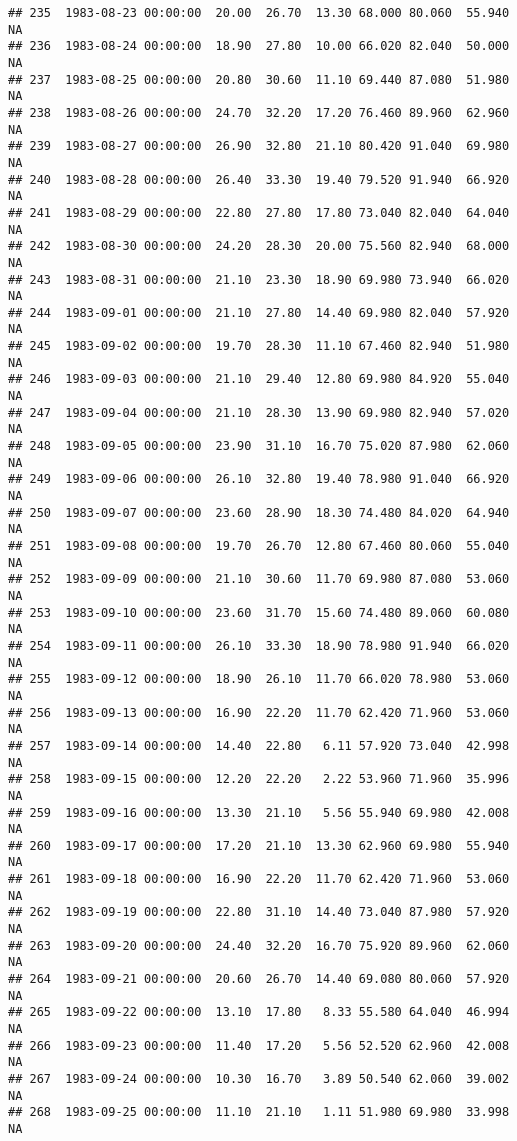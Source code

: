 \documentclass{article}\usepackage{graphicx, color}
\makeatletter
\newenvironment{kframe}{%
 \def\at@end@of@kframe{}%
 \ifinner\ifhmode%
  \def\at@end@of@kframe{\end{minipage}}%
  \begin{minipage}{\columnwidth}%
 \fi\fi%
 \def\FrameCommand##1{\hskip\@totalleftmargin \hskip-\fboxsep
 \colorbox{shadecolor}{##1}\hskip-\fboxsep
     \hskip-\linewidth \hskip-\@totalleftmargin \hskip\columnwidth}%
 \MakeFramed {\advance\hsize-\width
   \@totalleftmargin\z@ \linewidth\hsize
   \@setminipage}}%
 {\par\unskip\endMakeFramed%
 \at@end@of@kframe}
\newenvironment{knitrout}{}{} %
\makeatother
\begin{document}
\begin{knitrout}
\begin{kframe}
\begin{verbatim}
## 235  1983-08-23 00:00:00  20.00  26.70  13.30 68.000 80.060  55.940     NA
## 236  1983-08-24 00:00:00  18.90  27.80  10.00 66.020 82.040  50.000     NA
## 237  1983-08-25 00:00:00  20.80  30.60  11.10 69.440 87.080  51.980     NA
## 238  1983-08-26 00:00:00  24.70  32.20  17.20 76.460 89.960  62.960     NA
## 239  1983-08-27 00:00:00  26.90  32.80  21.10 80.420 91.040  69.980     NA
## 240  1983-08-28 00:00:00  26.40  33.30  19.40 79.520 91.940  66.920     NA
## 241  1983-08-29 00:00:00  22.80  27.80  17.80 73.040 82.040  64.040     NA
## 242  1983-08-30 00:00:00  24.20  28.30  20.00 75.560 82.940  68.000     NA
## 243  1983-08-31 00:00:00  21.10  23.30  18.90 69.980 73.940  66.020     NA
## 244  1983-09-01 00:00:00  21.10  27.80  14.40 69.980 82.040  57.920     NA
## 245  1983-09-02 00:00:00  19.70  28.30  11.10 67.460 82.940  51.980     NA
## 246  1983-09-03 00:00:00  21.10  29.40  12.80 69.980 84.920  55.040     NA
## 247  1983-09-04 00:00:00  21.10  28.30  13.90 69.980 82.940  57.020     NA
## 248  1983-09-05 00:00:00  23.90  31.10  16.70 75.020 87.980  62.060     NA
## 249  1983-09-06 00:00:00  26.10  32.80  19.40 78.980 91.040  66.920     NA
## 250  1983-09-07 00:00:00  23.60  28.90  18.30 74.480 84.020  64.940     NA
## 251  1983-09-08 00:00:00  19.70  26.70  12.80 67.460 80.060  55.040     NA
## 252  1983-09-09 00:00:00  21.10  30.60  11.70 69.980 87.080  53.060     NA
## 253  1983-09-10 00:00:00  23.60  31.70  15.60 74.480 89.060  60.080     NA
## 254  1983-09-11 00:00:00  26.10  33.30  18.90 78.980 91.940  66.020     NA
## 255  1983-09-12 00:00:00  18.90  26.10  11.70 66.020 78.980  53.060     NA
## 256  1983-09-13 00:00:00  16.90  22.20  11.70 62.420 71.960  53.060     NA
## 257  1983-09-14 00:00:00  14.40  22.80   6.11 57.920 73.040  42.998     NA
## 258  1983-09-15 00:00:00  12.20  22.20   2.22 53.960 71.960  35.996     NA
## 259  1983-09-16 00:00:00  13.30  21.10   5.56 55.940 69.980  42.008     NA
## 260  1983-09-17 00:00:00  17.20  21.10  13.30 62.960 69.980  55.940     NA
## 261  1983-09-18 00:00:00  16.90  22.20  11.70 62.420 71.960  53.060     NA
## 262  1983-09-19 00:00:00  22.80  31.10  14.40 73.040 87.980  57.920     NA
## 263  1983-09-20 00:00:00  24.40  32.20  16.70 75.920 89.960  62.060     NA
## 264  1983-09-21 00:00:00  20.60  26.70  14.40 69.080 80.060  57.920     NA
## 265  1983-09-22 00:00:00  13.10  17.80   8.33 55.580 64.040  46.994     NA
## 266  1983-09-23 00:00:00  11.40  17.20   5.56 52.520 62.960  42.008     NA
## 267  1983-09-24 00:00:00  10.30  16.70   3.89 50.540 62.060  39.002     NA
## 268  1983-09-25 00:00:00  11.10  21.10   1.11 51.980 69.980  33.998     NA

\end{verbatim}
\end{kframe}
\end{knitrout}
\end{document}
